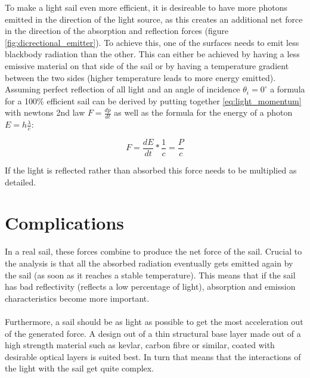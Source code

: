 \documentclass[14pt]{article}
\begin{document}
To make a light sail even more efficient, it is desireable to have more photons emitted in the direction of the light source, as this creates an additional net force in the
direction of the absorption and reflection forces (figure \ref{fig:dicrectional_emitter}). To achieve this, one of the surfaces needs to emit less blackbody radiation than
the other. This can either be achieved by having a less emissive material on that side of the sail or by having a temperature gradient between the two sides (higher temperature
leads to more energy emitted).\\

Assuming perfect reflection of all light and an angle of incidence $\theta_i = 0^\circ$ a formula for a 100\% efficient sail can be derived
by putting together \ref{eq:light_momentum} with newtons 2nd law $F = \frac{dp}{dt}$ as well as the formula for the energy of a photon $ E = h \frac{\lambda}{c}$:

\begin{equation}
  F = \frac{dE}{dt} * \frac{1}{c} = \frac{P}{c}
  \label{eq:light_force}
\end{equation}

If the light is reflected rather than absorbed this force needs to be multiplied as detailed.


\section{Complications}

In a real sail, these forces combine to produce the net force of the sail. Crucial to the analysis is that all the absorbed radiation eventually gets emitted again
by the sail (as soon as it reaches a stable temperature). This means that if the sail has bad reflectivity (reflects a low percentage of light), absorption and
emission characteristics become more important.\\
\\
Furthermore, a sail should be as light as possible to get the most acceleration out of the generated force. A design out of a thin structural base layer made out
of a high strength material such as kevlar, carbon fibre or similar, coated with desirable optical layers is suited best. In turn that means that the interactions
of the light with the sail get quite complex.\\
\end{document}
